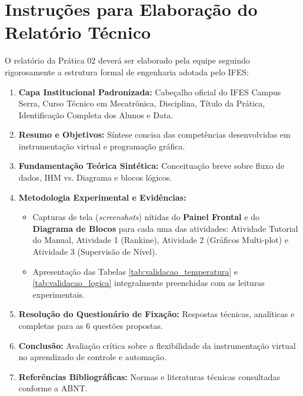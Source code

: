 \documentclass[11pt,a4paper]{article}
\begin{document}
\section{Instruções para Elaboração do Relatório Técnico}

O relatório da Prática 02 deverá ser elaborado pela equipe seguindo rigorosamente a estrutura formal de engenharia adotada pelo IFES:

\begin{enumerate}[noitemsep, topsep=1.0pt, parsep=0.4pt]
    \item \textbf{Capa Institucional Padronizada:} Cabeçalho oficial do IFES Campus Serra, Curso Técnico em Mecatrônica, Disciplina, Título da Prática, Identificação Completa dos Alunos e Data.
    \item \textbf{Resumo e Objetivos:} Síntese concisa das competências desenvolvidas em instrumentação virtual e programação gráfica.
    \item \textbf{Fundamentação Teórica Sintética:} Conceituação breve sobre fluxo de dados, IHM vs. Diagrama e blocos lógicos.
    \item \textbf{Metodologia Experimental e Evidências:}
    \begin{itemize}[noitemsep, topsep=0.8pt, parsep=0.3pt]
        \item Capturas de tela (\textit{screenshots}) nítidas do \textbf{Painel Frontal} e do \textbf{Diagrama de Blocos} para cada uma das atividades: Atividade Tutorial do Manual, Atividade 1 (Rankine), Atividade 2 (Gráficos Multi-plot) e Atividade 3 (Supervisão de Nível).
        \item Apresentação das Tabelas \ref{tab:validacao_temperatura} e \ref{tab:validacao_logica} integralmente preenchidas com as leituras experimentais.
    \end{itemize}
    \item \textbf{Resolução do Questionário de Fixação:} Respostas técnicas, analíticas e completas para as 6 questões propostas.
    \item \textbf{Conclusão:} Avaliação crítica sobre a flexibilidade da instrumentação virtual no aprendizado de controle e automação.
    \item \textbf{Referências Bibliográficas:} Normas e literaturas técnicas consultadas conforme a ABNT.
\end{enumerate}

\vspace{0.1cm}

\end{document}
